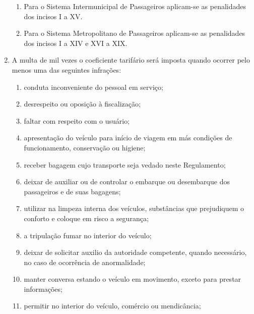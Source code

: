 \begin{enumerate}[resume, label=Art. \arabic*]
\begin{enumerate}[label= \S \arabic*] %

\item Para o Sistema Intermunicipal de Passageiros aplicam-se as penalidades dos incisos I a XV.

\item Para o Sistema Metropolitano de Passageiros aplicam-se as penalidades dos incisos I a XIV e XVI a XIX.

\end{enumerate}

\item A multa de mil vezes o coeficiente tarifário será imposta quando ocorrer pelo menos uma das seguintes infrações:

\begin{enumerate}[label=\roman*.]

\item conduta inconveniente do pessoal em serviço;

\item desrespeito ou oposição à fiscalização;

\item faltar com respeito com o usuário;

\item apresentação do veículo para início de viagem em más condições de funcionamento, conservação ou higiene;

\item receber bagagem cujo transporte seja vedado neste Regulamento;

\item deixar de auxiliar ou de controlar o embarque ou desembarque dos passageiros e de suas bagagens;

\item utilizar na limpeza interna dos veículos, substâncias que prejudiquem o conforto e coloque em risco a segurança;

\item a tripulação fumar no interior do veículo;

\item deixar de solicitar auxilio da autoridade competente, quando necessário, no caso de ocorrência de anormalidade;

\item manter conversa estando o veículo em movimento, exceto para prestar informações;

\item permitir no interior do veículo, comércio ou mendicância;


\end{enumerate}
\end{enumerate}
